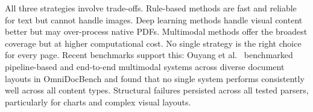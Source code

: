 All three strategies involve trade-offs. Rule-based methods are fast and
reliable for text but cannot handle images. Deep learning methods handle visual
content better but may over-process native PDFs. Multimodal methods offer the
broadest coverage but at higher computational cost. No single strategy is the
right choice for every page. Recent benchmarks support this: Ouyang et al.\
\autocite{omnidocbench2025} benchmarked pipeline-based and end-to-end multimodal
systems across diverse document layouts in OmniDocBench and found that no single
system performs consistently well across all content types. Structural failures
persisted across all tested parsers, particularly for charts and complex visual
layouts.
